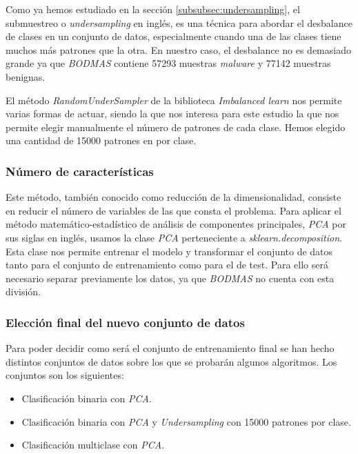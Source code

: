 Como ya hemos estudiado en la sección \ref{subsubsec:undersampling}, el submuestreo o \textit{undersampling} en inglés, es una técnica para abordar el desbalance de clases en un conjunto de datos, especialmente cuando una de las clases tiene muchos más patrones que la otra. En nuestro caso, el desbalance no es demasiado grande ya que \textit{BODMAS} contiene 57293 muestras \textit{malware} y 77142 muestras benignas.

\vspace{1em}

El método \textit{RandomUnderSampler} \cite{randundersampler} de la biblioteca \textit{Imbalanced learn} nos permite varias formas de actuar, siendo la que nos interesa para este estudio la que nos permite elegir manualmente el número de patrones de cada clase. Hemos elegido una cantidad de 15000 patrones en por clase.

\subsubsection{Número de características}
\label{subsubsec:num_caract}

Este método, también conocido como reducción de la dimensionalidad, consiste en reducir el número de variables de las que consta el problema. Para aplicar el método matemático-estadístico de análisis de componentes principales, \textit{PCA} por sus siglas en inglés, usamos la clase \textit{PCA} \cite{sklearn_pca} perteneciente a \textit{sklearn.decomposition}. Esta clase nos permite entrenar el modelo y transformar el conjunto de datos tanto para el conjunto de entrenamiento como para el de test. Para ello será necesario separar previamente los datos, ya que \textit{BODMAS} no cuenta con esta división.

\subsubsection{Elección final del nuevo conjunto de datos}
\label{subsubsec:eleccion_dataset}

Para poder decidir como será el conjunto de entrenamiento final se han hecho distintos conjuntos de datos sobre los que se probarán algunos algoritmos. Los conjuntos son los siguientes:

\begin{itemize}
	\item Clasificación binaria con \textit{PCA}.
	\item Clasificación binaria con \textit{PCA} y \textit{Undersampling} con 15000 patrones por clase.
	\item Clasificación multiclase con \textit{PCA}.
\end{itemize}

